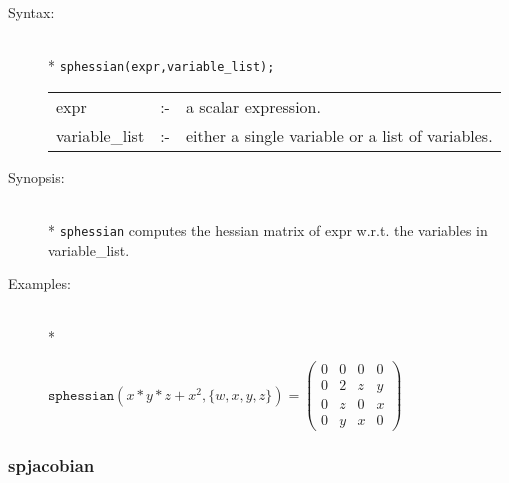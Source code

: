 \begin{description}
\item[Syntax:]\mbox{}\\*
 \texttt{sphessian(expr,variable\_list);}\\[2mm]
\begin{tabular}{l l l}
expr           &:-& a scalar expression. \\
variable\_list &:-& either a single variable or a list of variables.
\end{tabular}

\item[Synopsis:]\mbox{}\\*
                \texttt{sphessian} computes the hessian matrix of expr w.r.t.
                the variables in variable\_list. 

\item[Examples:]\mbox{}\\*
\begin{flushleft}  
\hspace*{0.1in}
\begin{math}        
\texttt{sphessian}(x*y*z+x^2,\{w,x,y,z\})  = 
\begin{pmatrix} 0 & 0 & 0 & 0 \\ 0 & 2 & z & y \\ 0 & z & 0 
& x \\ 0 & y & x & 0
\end{pmatrix} 
\end{math}  
\end{flushleft}
\end{description}

\subsubsection{spjacobian}
\label{sparse:spjacobian}

